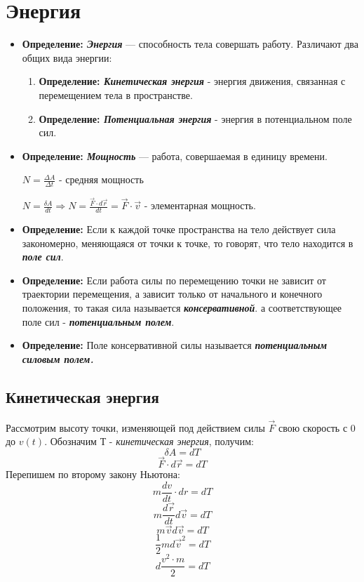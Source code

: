 \documentclass[12pt,a4paper]{report}
\begin{document}
\section{Энергия}
\begin{itemize}
    \item \textbf{Определение: \textit{Энергия}} --- способность тела совершать работу.
          Различают два общих вида энергии:
          \begin{enumerate}
              \item \textbf{Определение: \textit{Кинетическая энергия}} - энергия движения, связанная с перемещением тела в пространстве.
              \item \textbf{Определение: \textit{Потенциальная энергия}} - энергия в потенциальном поле сил.
          \end{enumerate}

    \item \textbf{Определение: \textit{Мощность}} --- работа, совершаемая в единицу времени.

          $N = \frac{\Delta A}{\Delta t}$ - средняя мощность

          $N = \frac{\delta A}{dt} \Rightarrow N = \frac{\vec F \cdot d\vec r}{dt} = \vec F \cdot \vec v$ - элементарная мощность.

    \item \textbf{Определение:} Если к каждой точке пространства на тело действует сила закономерно, меняющаяся от точки к точке, то говорят, что тело находится в \textbf{\textit{поле сил}}.

    \item \textbf{Определение:} Если работа силы по перемещению точки не зависит от траектории перемещения, а зависит только от начального и конечного положения, то такая сила называется \textbf{\textit{консервативной}}. а соответствующее поле сил - \textbf{\textit{потенциальным полем}}.

    \item \textbf{Определение:} Поле консервативной силы называется \textbf{\textit{потенциальным силовым полем.}}
\end{itemize}
\subsection{Кинетическая энергия}

Рассмотрим высоту точки, изменяющей под действием силы $\vec F$ свою скорость с 0 до $v(t)$. Обозначим Т - \textit{кинетическая энергия}, получим:
\[ \delta A = dT \]
\[ \vec F \cdot d \vec r  = dT\]
Перепишем по второму закону Ньютона:
\[ m\frac{dv}{dt} \cdot dr = dT \]
\[ m\frac{d \vec r}{dt} d\vec v = dT \] \[ m \vec v d \vec v = dT \]
\[ \frac{1}{2}md \vec v^2 = dT \]
\[ d\frac{v^2 \cdot m}{2} = dT\]
\end{document}
